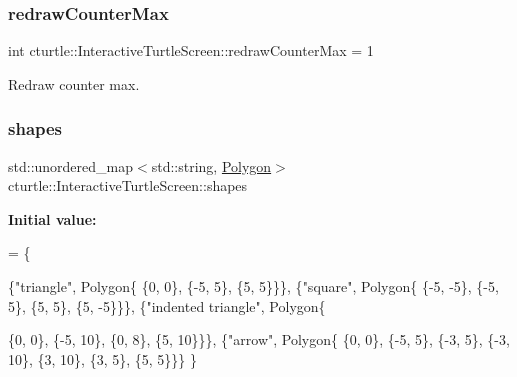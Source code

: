 \subsubsection{\texorpdfstring{redraw\+Counter\+Max}{redrawCounterMax}}
{\footnotesize\ttfamily int cturtle\+::\+Interactive\+Turtle\+Screen\+::redraw\+Counter\+Max = 1\hspace{0.3cm}{\ttfamily [protected]}}

Redraw counter max. \mbox{\label{classcturtle_1_1InteractiveTurtleScreen_ac11df426fc4bc95a516e5491af3f0c7e}} 
\subsubsection{\texorpdfstring{shapes}{shapes}}
{\footnotesize\ttfamily std\+::unordered\+\_\+map$<$std\+::string, \hyperlink{classcturtle_1_1Polygon}{Polygon}$>$ cturtle\+::\+Interactive\+Turtle\+Screen\+::shapes\hspace{0.3cm}{\ttfamily [protected]}}

{\bfseries Initial value\+:}
\begin{DoxyCode}
= \{
            
            \{\textcolor{stringliteral}{"triangle"},
                Polygon\{
                    \{0, 0\},
                    \{-5, 5\},
                    \{5, 5\}\}\},
            \{\textcolor{stringliteral}{"square"},
                Polygon\{
                    \{-5, -5\},
                    \{-5, 5\},
                    \{5, 5\},
                    \{5, -5\}\}\},
            \{\textcolor{stringliteral}{"indented triangle"},
                Polygon\{
                    
                    \{0, 0\},
                    \{-5, 10\},
                    \{0, 8\},
                    \{5, 10\}\}\},
            \{\textcolor{stringliteral}{"arrow"},
                Polygon\{
                    \{0, 0\},
                    \{-5, 5\},
                    \{-3, 5\},
                    \{-3, 10\},
                    \{3, 10\},
                    \{3, 5\},
                    \{5, 5\}\}\}
        \}
\end{DoxyCode}
\mbox{\label{classcturtle_1_1InteractiveTurtleScreen_ae227fdb4ee9017964e314d6e0c76cee4}} 
